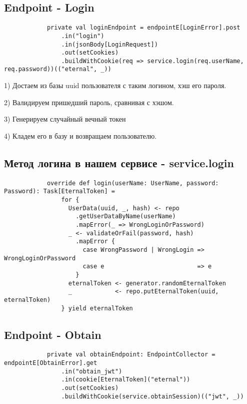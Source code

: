 \documentclass[14pt]{extarticle}
\begin{document}
    \subsection{Endpoint - Login}
    \begin{verbatim}
            private val loginEndpoint = endpointE[LoginError].post
                .in("login")
                .in(jsonBody[LoginRequest])
                .out(setCookies)
                .buildWithCookie(req => service.login(req.userName, req.password))(("eternal", _))
    \end{verbatim}

    1) Достаем из базы uuid пользователя с таким логином, хэш его пароля.

    2) Валидируем пришедший пароль, сравнивая с хэшом.

    3) Генерируем случайный вечный токен

    4) Кладем его в базу и возвращаем пользователю.

    \subsection{Метод логина в нашем сервисе - service.login}
    \begin{verbatim}
            override def login(userName: UserName, password: Password): Task[EternalToken] =
                for {
                  UserData(uuid, _, hash) <- repo
                    .getUserDataByName(userName)
                    .mapError(_ => WrongLoginOrPassword)
                  _ <- validateOrFail(password, hash)
                    .mapError {
                      case WrongPassword | WrongLogin => WrongLoginOrPassword
                      case e                          => e
                    }
                  eternalToken <- generator.randomEternalToken
                  _            <- repo.putEternalToken(uuid, eternalToken)
                } yield eternalToken
    \end{verbatim}

    \subsection{Endpoint - Obtain}
    \begin{verbatim}
            private val obtainEndpoint: EndpointCollector = endpointE[ObtainError].get
                .in("obtain_jwt")
                .in(cookie[EternalToken]("eternal"))
                .out(setCookies)
                .buildWithCookie(service.obtainSession)(("jwt", _))
    \end{verbatim}
\end{document}
